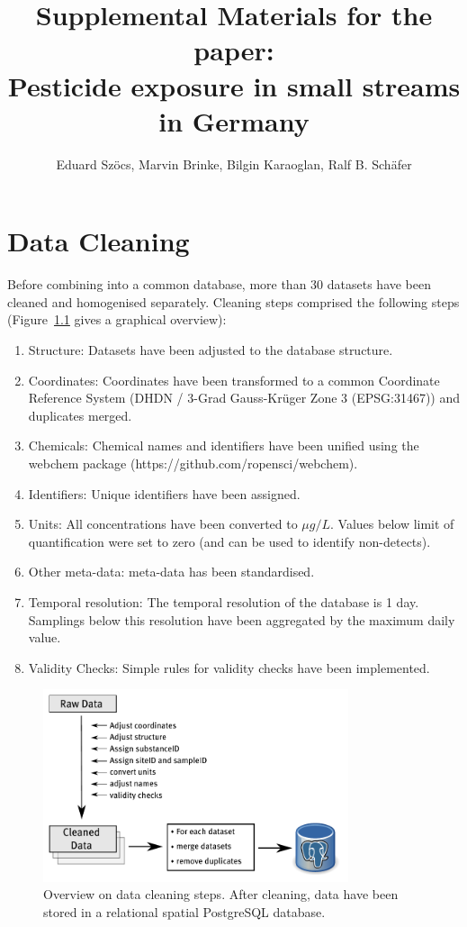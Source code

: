 \documentclass[pdftex,a4paper]{scrreprt}
\title{Supplemental Materials for the paper: \\ Pesticide exposure in small streams in Germany}
\author{Eduard Szöcs, Marvin Brinke, Bilgin Karaoglan, Ralf B. Schäfer}
\date{}
\begin{document}
\maketitle

\tableofcontents
\listoffigures
\listoftables



\chapter{Data Cleaning}
Before combining into a common database, more than 30 datasets have been cleaned and homogenised separately.
Cleaning steps comprised the following steps (Figure~\ref{fig:data_cleaning} gives a graphical overview):

\begin{enumerate}
	\item Structure: Datasets have been adjusted to the database structure.
	\item Coordinates: Coordinates have been transformed to a common Coordinate Reference System (DHDN / 3-Grad Gauss-Krüger Zone 3 (EPSG:31467)) and duplicates merged.
	\item Chemicals: Chemical names and identifiers have been unified using the webchem package (https://github.com/ropensci/webchem).
	\item  Identifiers: Unique identifiers have been assigned.
	\item Units: All concentrations have been converted to $\mu g/L$. Values below limit of quantification were set to zero (and can be used to identify non-detects).
	\item Other meta-data: meta-data has been standardised.
	\item Temporal resolution: The temporal resolution of the database is 1 day. Samplings below this resolution have been aggregated by the maximum daily value.
	\item Validity Checks: Simple rules for validity checks have been implemented.
\end{enumerate}

\begin{figure}[ht]
	\centering
	\includegraphics[width = 0.8\textwidth]{data_cleaning}
	\caption[Overview on data cleaning steps.]{Overview on data cleaning steps. After cleaning, data have been stored in a relational spatial PostgreSQL database.}
	\label{fig:data_cleaning}
\end{figure}
\end{document}
